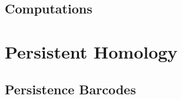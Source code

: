 




%         

\subsection{Computations}

\section{Persistent Homology}\label{sec:per-hom}

\subsection{Persistence Barcodes}

